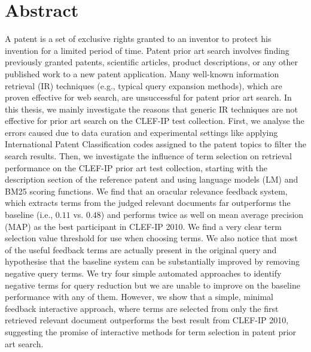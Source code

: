 \chapter*{Abstract}
\vspace{-1em}
A patent is a set of exclusive rights granted to an inventor to protect 
his invention for a limited period of time. Patent prior art search involves 
finding previously granted patents, 
scientific articles, product descriptions, or any other published work 
to a new patent application.
Many well-known information retrieval (IR) techniques (e.g., typical query expansion methods), which are proven effective 
for web search, are unsuccessful for patent 
prior art search.
In this thesis, we mainly investigate the reasons that generic IR techniques are not 
effective for prior art search on the CLEF-IP test collection.   
First, we analyse the errors caused due to data curation and experimental settings 
like applying International Patent Classification codes assigned to the patent topics 
to filter the search results.  
Then, we investigate the influence of term selection on retrieval
performance on the CLEF-IP prior art test collection, starting with
the description section of the reference patent and using language models (LM) and BM25
scoring functions. We find that an oracular relevance feedback system,
which extracts terms from the judged relevant documents far
outperforms the baseline (i.e., $0.11$ vs. $ 0.48 $) and performs twice as well on mean average precision (MAP) as the best
participant in CLEF-IP 2010. We find a very clear term selection value
threshold for use when choosing terms.  We also notice that most of
the useful feedback terms are actually present in the original query
and hypothesise that the baseline system can be substantially
improved by removing negative query terms.
We try four simple automated approaches to identify negative terms
for query reduction but we are unable to improve on the baseline
performance with any of them. However, we show that a
simple, minimal feedback interactive approach, where terms are selected
from only the first retrieved relevant document outperforms the best
result from CLEF-IP 2010, suggesting the promise of interactive methods
for term selection in patent prior art search.

